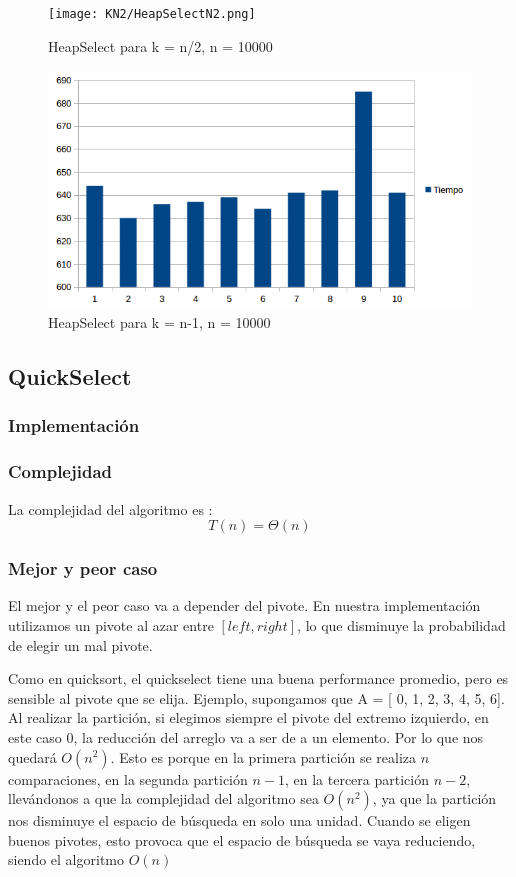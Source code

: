 \begin{figure}[H]
\centering
\texttt{[image: KN2/HeapSelectN2.png]}
\caption{HeapSelect para k = n/2, n = 10000}
\end{figure}

\begin{figure}[H]
\centering
\includegraphics[width=\textwidth]{KN/HeapSelectN.png}
\caption{HeapSelect para k = n-1, n = 10000}
\end{figure}


\newpage

\subsection{QuickSelect}
\subsubsection{Implementación}

\subsubsection{Complejidad}
La complejidad del algoritmo es \cite{CORMEN_QUICKSELECT}:
$$ T(n) = \Theta(n) $$
\subsubsection{Mejor y peor caso}
El mejor y el peor caso va a depender del pivote. En nuestra implementación utilizamos un pivote al azar entre $[left, right]$, lo que disminuye la probabilidad de elegir un mal pivote.

Como en quicksort, el quickselect tiene una buena performance promedio, pero es sensible al pivote que se elija.
Ejemplo, supongamos que A = [ 0, 1, 2, 3, 4, 5, 6].
Al realizar la partición, si elegimos siempre el pivote del extremo izquierdo, en este caso 0, la reducción del arreglo va a ser de a un elemento. Por lo que nos quedará $O(n^2)$. Esto es porque en la primera partición se realiza $n$ comparaciones, en la segunda partición $n-1$, en la tercera partición $n-2$, llevándonos a que la complejidad del algoritmo sea $O(n^2)$, ya que la partición nos disminuye el espacio de búsqueda en solo una unidad.
Cuando se eligen buenos pivotes, esto provoca que el espacio de búsqueda se vaya reduciendo, siendo el algoritmo $O(n)$ \cite{WIKIPEDIA_QUICKSELECT}

